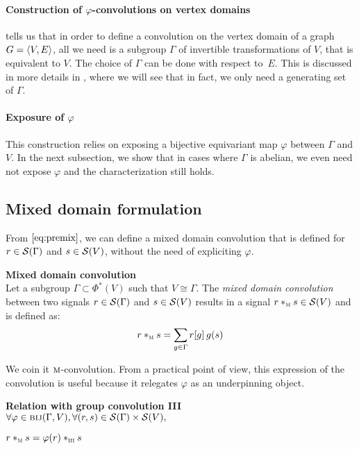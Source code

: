 \paragraph{Construction of $\varphi$-convolutions on vertex domains}
 tells us that in order to define a convolution on the vertex domain of a graph $\gve$, all we need is a subgroup $\Gamma$ of invertible transformations of $V$, that is equivalent to $V$. The choice of $\Gamma$ can be done with respect to~$E$. This is discussed in more details in , where we will see that in fact, we only need a generating set of $\Gamma$.

\paragraph{Exposure of $\varphi$}
This construction relies on exposing a bijective equivariant map $\varphi$ between $\Gamma$ and $V$. In the next subsection, we show that in cases where $\Gamma$ is abelian, we even need not expose $\varphi$ and the characterization still holds.

\subsection{Mixed domain formulation}

From $\eqref{eq:premix}$, we can define a mixed domain convolution \ie that is defined for $r \in \cs(\Gamma)$ and $s \in \cs(V)$, without the need of expliciting $\varphi$.

\begin{definition}\textbf{Mixed domain convolution}\\
Let a subgroup $\Gamma \subset \Phi^*(V)$ such that $V \cong \Gamma$.
The \emph{mixed domain convolution} between two signals $r \in \cs(\Gamma)$ and $s \in \cs(V)$ results in a signal $r \ast_{\M} s \in \cs(V)$ and is defined as:
\begin{gather*}
r \ast_{\M} s = \displaystyle \sum_{g \in \Gamma} r[g] \h{2} g(s)
\end{gather*}
\label{def:convm}
\end{definition}

We coin it $\M$-convolution. From a practical point of view, this expression of the convolution is useful because it relegates $\varphi$ as an underpinning object.%

\begin{lemma}\textbf{Relation with group convolution III}\\
$\forall \varphi \in \bij(\Gamma, V), \forall (r,s) \in \cs(\Gamma) \times \cs(V),$\\
\centerline{$r \ast_{\M} s = \varphi(r) \ast_{\III} s$}
\label{lem:rel3m}
\end{lemma}

